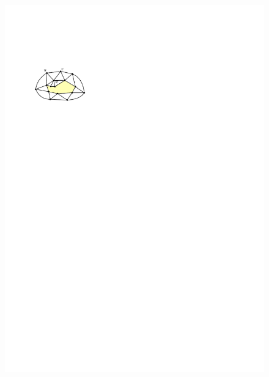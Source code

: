\documentclass{article}
\theoremstyle{definition}
\begin{document}
\begin{figure}
  \includegraphics[page=2]{figs/2_3_figure}

\end{figure}
\end{document}

